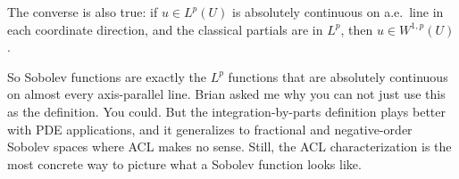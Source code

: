 The converse is also true: if $u \in L^p(U)$ is absolutely continuous on a.e.\ line in each coordinate direction, and the classical partials are in $L^p$, then $u \in W^{1,p}(U)$.

So Sobolev functions are exactly the $L^p$ functions that are absolutely continuous on almost every axis-parallel line. Brian asked me why you can not just use this as the definition. You could. But the integration-by-parts definition plays better with PDE applications, and it generalizes to fractional and negative-order Sobolev spaces where ACL makes no sense. Still, the ACL characterization is the most concrete way to picture what a Sobolev function looks like.
